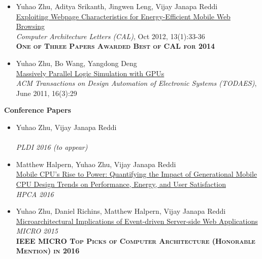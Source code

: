 \documentclass[margin, 9pt]{res} %
\begin{document}
\begin{resume}
\begin{itemize}[leftmargin=*]
	\item Yuhao Zhu, Aditya Srikanth, Jingwen Leng, Vijay Janapa Reddi\\[2pt]
          \href{http://yuhaozhu.com/pubs/cal12.pdf}{Exploiting Webpage Characteristics for Energy-Efficient Mobile Web Browsing}\\
          \textit{Computer Architecture Letters (CAL)}, Oct 2012, 13(1):33-36\\
          \textbf{\textsc{One of Three Papers Awarded Best of CAL for 2014}}

	\item Yuhao Zhu, Bo Wang, Yangdong Deng\\[2pt]
          \href{http://yuhaozhu.com/pubs/todaes11.pdf}{Massively Parallel Logic Simulation with GPUs}\\
          \textit{ACM Transactions on Design Automation of Electronic Systems (TODAES)}, June 2011, 16(3):29
\end{itemize}

\vspace*{7pt}
{\large\textbf{Conference Papers}}

\begin{itemize}[leftmargin=*] \itemsep 0pt
	\item Yuhao Zhu, Vijay Janapa Reddi\\[2pt]
          {\color{blue}{GreenWeb: Language Extensions for Energy-Efficient Mobile Web Computing}}\\
          \textit{PLDI 2016 (to appear)}

	\item Matthew Halpern, Yuhao Zhu, Vijay Janapa Reddi\\[2pt]
          {\href{http://yuhaozhu.com/pubs/hpca16.pdf}{Mobile CPU's Rise to Power: Quantifying the Impact of Generational Mobile CPU Design Trends on Performance, Energy, and User Satisfaction}}\\
          \textit{HPCA 2016}

	\item Yuhao Zhu, Daniel Richins, Matthew Halpern, Vijay Janapa Reddi\\[2pt]
          \href{http://yuhaozhu.com/pubs/micro15.pdf}{Microarchitectural Implications of Event-driven Server-side Web Applications}\\
          \textit{MICRO 2015}\\
          \textbf{\textsc{IEEE MICRO Top Picks of Computer Architecture (Honorable Mention) in 2016}}


\end{itemize}
\end{resume}
\end{document}
